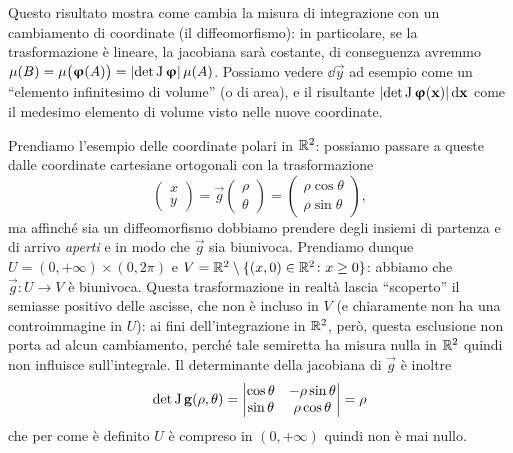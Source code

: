 Questo risultato mostra come cambia la misura di integrazione con un cambiamento di coordinate (il diffeomorfismo): in particolare, se la trasformazione è lineare, la jacobiana sarà costante, di conseguenza avremmo $\mu(B)=\mu\big(\bm{\upvarphi}(A)\big)=\left|{\det\operatorname{J}\bm{\upvarphi}}\right|\mu(A)$.
Possiamo vedere $\dd\vec y$ ad esempio come un ``elemento infinitesimo di volume'' (o di area), e il risultante $\left|{\det\operatorname{J}\bm{\upvarphi}(\mathbf{x})}\right|\textup{d}\mathbf{x}$ come il medesimo elemento di volume visto nelle nuove coordinate.

Prendiamo l'esempio delle coordinate polari in $\mathbb{R}^2$: possiamo passare a queste dalle coordinate cartesiane ortogonali con la trasformazione
\begin{equation}
	\begin{pmatrix}
		x\\y
	\end{pmatrix}
	=\vec g
	\begin{pmatrix}
		\rho\\\theta
	\end{pmatrix}
	=
	\begin{pmatrix}
		\rho\cos\theta\\\rho\sin\theta
	\end{pmatrix},
\end{equation}
ma affinch\'e sia un diffeomorfismo dobbiamo prendere degli insiemi di partenza e di arrivo \emph{aperti} e in modo che $\vec g$ sia biunivoca.
Prendiamo dunque $U=(0,+\infty)\times(0,2\pi)$ e $V=\mathbb{R}^2\setminus\{(x,0)\in\mathbb{R}^2\colon x\geq 0\}$: abbiamo che $\vec g\colon U\to V$ è biunivoca.
Questa trasformazione in realtà lascia ``scoperto'' il semiasse positivo delle ascisse, che non è incluso in $V$ (e chiaramente non ha una controimmagine in $U$): ai fini dell'integrazione in $\mathbb{R}^2$, però, questa esclusione non porta ad alcun cambiamento, perch\'e tale semiretta ha misura nulla in $\mathbb{R}^2$ quindi non influisce sull'integrale.
Il determinante della jacobiana di $\vec g$ è inoltre
\begin{equation}
	\det\operatorname{J}\mathbf{g}(\rho,\theta)=
	\begin{vmatrix}
		\cos\theta &-\rho\sin\theta\\
		\sin\theta &\rho\cos\theta
	\end{vmatrix}
	=\rho
\end{equation}
che per come è definito $U$ è compreso in $(0,+\infty)$ quindi non è mai nullo.


